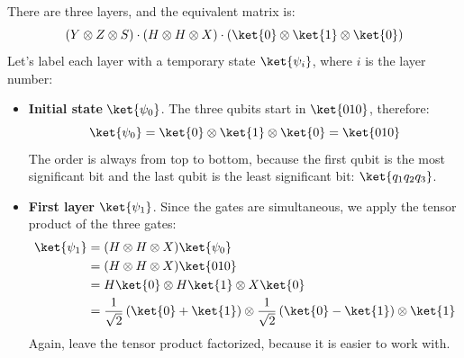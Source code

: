\noindent
There are three layers, and the equivalent matrix is:
\begin{equation*}
    (Y \otimes Z \otimes S) \cdot (H \otimes H \otimes X) \cdot \left(\ket{0} \otimes \ket{1} \otimes \ket{0}\right)
\end{equation*}
Let's label each layer with a temporary state $\ket{\psi_i}$, where $i$ is the layer number:
\begin{itemize}
    \item \textbf{Initial state} $\ket{\psi_0}$. The three qubits start in $\ket{010}$, therefore:
    \begin{equation*}
        \ket{\psi_0} = \ket{0} \otimes \ket{1} \otimes \ket{0} = \ket{010}
    \end{equation*}
    The order is always from top to bottom, because the first qubit is the most significant bit and the last qubit is the least significant bit: $\ket{q_1 q_2 q_3}$.


    \item \textbf{First layer} $\ket{\psi_1}$. Since the gates are simultaneous, we apply the tensor product of the three gates:
    \begin{equation*}
        \begin{aligned}
            \ket{\psi_1} &= (H \otimes H \otimes X) \ket{\psi_0} \\
            &= (H \otimes H \otimes X) \ket{010} \\
            &= H\ket{0} \otimes H\ket{1} \otimes X\ket{0} \\
            &= \frac{1}{\sqrt{2}} \left(\ket{0} + \ket{1}\right) \otimes \frac{1}{\sqrt{2}} \left(\ket{0} - \ket{1}\right) \otimes \ket{1}
        \end{aligned}
    \end{equation*}
    \textcolor{Green3}{} Again, leave the tensor product factorized, because it is easier to work with.



\end{itemize}

